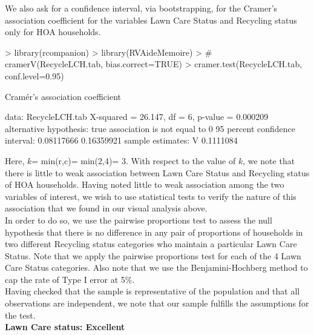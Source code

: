 \documentclass{article}
\begin{document}
We also ask for a confidence interval, via bootstrapping, for the Cramer's association coefficient for the variables Lawn Care Status and Recycling status only for HOA households. 

\begin{Schunk}
\begin{Sinput}
> library(rcompanion)
> library(RVAideMemoire)
> # cramerV(RecycleLCH.tab, bias.correct=TRUE)
> cramer.test(RecycleLCH.tab, conf.level=0.95)
\end{Sinput}
\begin{Soutput}
	Cramér's association coefficient

data:  RecycleLCH.tab
X-squared = 26.147, df = 6, p-value = 0.000209
alternative hypothesis: true association is not equal to 0
95 percent confidence interval:
 0.08117666 0.16359921
sample estimates:
        V 
0.1111084 
\end{Soutput}
\end{Schunk}

Here, $k$= min(r,c)= min(2,4)= 3. With respect to the value of $k$, we note that there is little to weak association between Lawn Care Status and Recycling status of HOA households. Having noted little to weak association among the two variables of interest, we wish to use statistical tests to verify the nature of this association that we found in our visual analysis above.\\

In order to do so, we use the pairwise proportions test to assess the null hypothesis that there is no difference in any pair of proportions of households in two different Recycling status categories who maintain a particular Lawn Care Status. Note that we apply the pairwise proportions test for each of the 4 Lawn Care Status categories. Also note that we use the Benjamini-Hochberg method to cap the rate of Type I error at 5\%.\\


Having checked that the sample is representative of the population and that all observations are independent, we note that our sample fulfills the assumptions for the test.\\

\textbf{Lawn Care status: Excellent}
\end{document}
